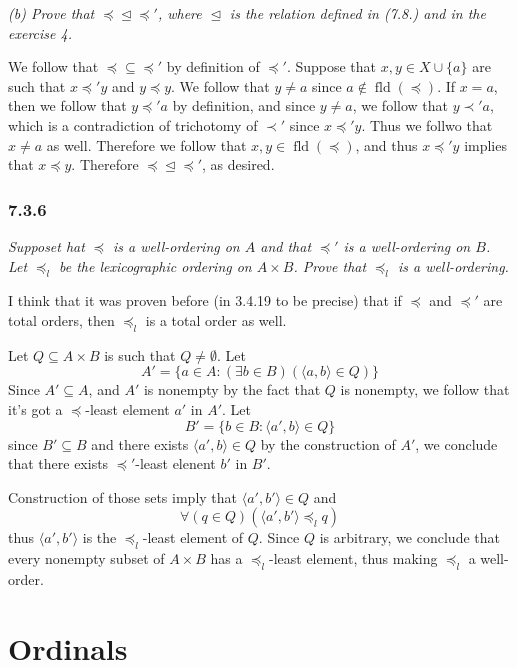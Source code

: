 \documentclass[11pt,oneside,titlepage]{book}
\DeclareMathOperator \fld {fld}
\newcommand{\eangle}[1]{\langle #1 \rangle}
\newcommand{\set}[1]{\{ #1 \}}
\begin{document}
\textit{(b) Prove that $\preceq \trianglelefteq \preceq'$, where $\trianglelefteq$
  is the relation defined in (7.8.) and in the exercise 4.}

We follow that
$\preceq \subseteq \preceq'$ by definition of $\preceq'$. Suppose that
$x, y \in X \cup \set{a}$ are such that $x \preceq' y$ and $y \preceq y$.
We follow that $y \neq a$ since $a \notin \fld(\preceq)$. If $x = a$, then we follow that
$y \preceq' a$ by definition, and since $y \neq a$, we follow that $y \prec' a$, which
is a contradiction of trichotomy of $\prec'$ since $x \preceq' y$. Thus we follwo that
$x \neq a$ as well. Therefore we follow that $x, y \in \fld(\preceq)$, and thus
$x \preceq' y$ implies that $x \preceq y$. Therefore $\preceq \trianglelefteq \preceq'$,
as desired.

\subsection*{7.3.6}

\textit{Supposet hat $\preceq$ is a well-ordering on $A$ and that $\preceq'$ is a well-ordering
  on $B$. Let $\preceq_l$ be the lexicographic ordering on $A \times B$. Prove that $\preceq_l$
  is a well-ordering.}

I think that it was proven before (in 3.4.19 to be precise) that
if $\preceq$ and $\preceq'$ are total orders, then $\preceq_l$ is a total order as well.

Let $Q \subseteq A \times B$ is such that $Q \neq \emptyset$. Let
$$A' = \set{a \in A: (\exists b \in B)(\eangle{a, b} \in Q)}$$
Since $A' \subseteq A$, and $A'$ is nonempty by the fact that $Q$ is nonempty,
we follow that it's got a $\preceq$-least element $a'$ in $A'$.
Let
$$B' = \set{b \in B: \eangle{a', b} \in Q}$$
since $B' \subseteq B$ and there exists $\eangle{a', b} \in Q$ by the construction of $A'$,
we conclude that there exists $\preceq'$-least elenent $b'$ in $B'$.

Construction of those sets imply that $\eangle{a', b'} \in Q$ and
$$\forall(q \in Q)(\eangle{a', b'} \preceq_l q)$$
thus $\eangle{a', b'}$ is the $\preceq_l$-least element of $Q$. Since $Q$ is arbitrary,
we conclude that every nonempty subset of $A \times B$ has a $\preceq_l$-least element,
thus making $\preceq_l$ a well-order.

\chapter{Ordinals}
\end{document}
